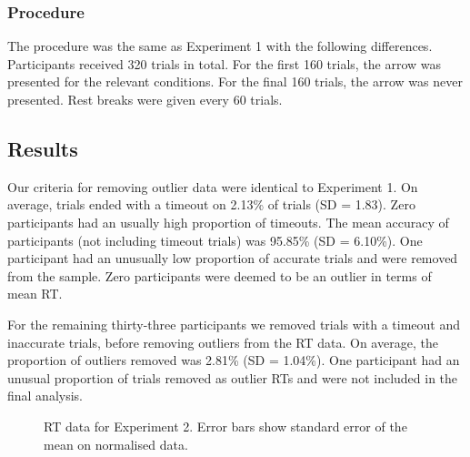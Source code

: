 \documentclass[
  man,
  floatsintext,
  longtable,
  nolmodern,
  notxfonts,
  notimes,
  colorlinks=true,linkcolor=blue,citecolor=blue,urlcolor=blue]{apa7}
\begin{document}
\subsubsection{Procedure}\label{procedure-1}

The procedure was the same as Experiment 1 with the following
differences. Participants received 320 trials in total. For the first
160 trials, the arrow was presented for the relevant conditions. For the
final 160 trials, the arrow was never presented. Rest breaks were given
every 60 trials.

\subsection{Results}\label{results-1}

Our criteria for removing outlier data were identical to Experiment 1.
On average, trials ended with a timeout on 2.13\% of trials (SD = 1.83).
Zero participants had an usually high proportion of timeouts. The mean
accuracy of participants (not including timeout trials) was 95.85\% (SD
= 6.10\%). One participant had an unusually low proportion of accurate
trials and were removed from the sample. Zero participants were deemed
to be an outlier in terms of mean RT.

For the remaining thirty-three participants we removed trials with a
timeout and inaccurate trials, before removing outliers from the RT
data. On average, the proportion of outliers removed was 2.81\% (SD =
1.04\%). One participant had an unusual proportion of trials removed as
outlier RTs and were not included in the final analysis.

\begin{figure}[H]

\caption{\label{fig-RT-exp2}RT data for Experiment 2. Error bars show
standard error of the mean on normalised data.}


\end{figure}%
\end{document}
